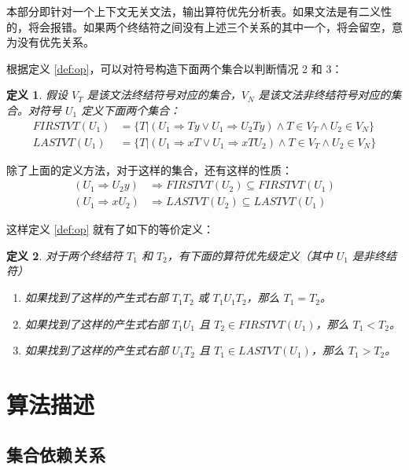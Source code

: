 \documentclass[UTF8]{article}
\newtheorem{definition}{定义}
\begin{document}
本部分即针对一个上下文无关文法，输出算符优先分析表。如果文法是有二义性的，将会报错。如果两个终结符之间没有上述三个关系的其中一个，将会留空，意为没有优先关系。

根据定义 \ref{def:op}，可以对符号构造下面两个集合以判断情况 2 和 3：

\begin{definition}\label{def:vt}
    假设 $V_T$ 是该文法终结符号对应的集合，$V_N$ 是该文法非终结符号对应的集合。对符号 $U_1$ 定义下面两个集合：
    \begin{align}
        \textit{FIRSTVT}(U_1) &= \{T|(U_1\Rightarrow Ty \vee U_1\Rightarrow U_2Ty)\land T\in V_T\land U_2\in V_N\} \label{eq:mono1} \\
        \textit{LASTVT}(U_1) &= \{T|(U_1\Rightarrow xT \vee U_1\Rightarrow xTU_2)\land T\in V_T\land U_2\in V_N\} \label{eq:mono2}
    \end{align}
\end{definition}

除了上面的定义方法，对于这样的集合，还有这样的性质：
\begin{align}
    (U_1\Rightarrow U_2y) &\Rightarrow \textit{FIRSTVT}(U_2)\subseteq \textit{FIRSTVT}(U_1) \label{eq:con1} \\
    (U_1\Rightarrow xU_2) &\Rightarrow \textit{LASTVT}(U_2)\subseteq \textit{LASTVT}(U_1) \label{eq:con2}
\end{align}

这样定义 \ref{def:op} 就有了如下的等价定义：
\begin{definition}\label{def:opn}
    对于两个终结符 $T_1$ 和 $T_2$，有下面的算符优先级定义（其中 $U_1$ 是非终结符）
    \begin{enumerate}
        \item 如果找到了这样的产生式右部 $T_1T_2$ 或 $T_1U_1T_2$，那么 $T_1=T_2$。
        \item 如果找到了这样的产生式右部 $T_1U_1$ 且 $T_2\in\textit{FIRSTVT}(U_1)$，那么 $T_1<T_2$。
        \item 如果找到了这样的产生式右部 $U_1T_2$ 且 $T_1\in\textit{LASTVT}(U_1)$，那么 $T_1>T_2$。
    \end{enumerate}
\end{definition}

\section{算法描述}

\subsection{集合依赖关系}
\end{document}
